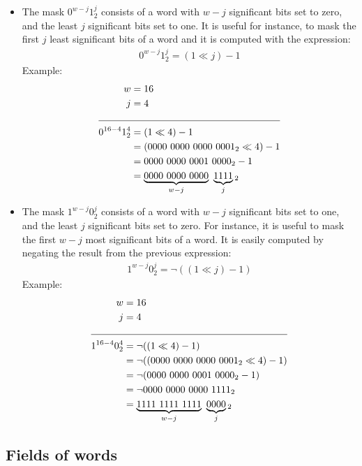 \begin{itemize}
    \item
    The mask $0^{w-j} 1^j_2$ consists of a word with $w-j$ significant bits set to zero, and the least $j$ significant bits set to one. It is useful for instance, to mask the first $j$ least significant bits of a word and it is computed with the expression:
    \begin{align*}
        0^{w-j} 1^j_2 = (1 \ll j) - 1
    \end{align*}
    Example:
    \begin{align*}
        w &= 16\\
        j &= 4\\
        \cline{1-2}
        0^{16-4} 1^4_2 &= (1 \ll 4) - 1\\
        &= (0000\ 0000\ 0000\ 0001_2 \ll 4) - 1\\
        &= 0000\ 0000\ 0001\ 0000_2 - 1\\
        &= \underbrace{0000\ 0000\ 0000}_{w-j}\ \underbrace{1111}_{j}{}_2
    \end{align*}
    
    \item
    The mask $1^{w-j} 0^j_2$ consists of a word with $w-j$ significant bits set to one, and the least $j$ significant bits set to zero. For instance, it is useful to mask the first $w - j$ most significant bits of a word. It is easily computed by negating the result from the previous expression:
    \begin{align*}
        1^{w-j} 0^j_2= \neg((1 \ll j) - 1)
    \end{align*}
    Example:
    \begin{align*}
        w &= 16\\
        j &= 4\\
        \cline{1-2}
        1^{16-4} 0^4_2 &= \neg((1 \ll 4) - 1)\\
        &= \neg((0000\ 0000\ 0000\ 0001_2 \ll 4) - 1)\\
        &= \neg(0000\ 0000\ 0001\ 0000_2 - 1)\\
        &= \neg0000\ 0000\ 0000\ 1111_2\\
        &= \underbrace{1111\ 1111\ 1111}_{w-j}\ \underbrace{0000}_{j}{}_2
    \end{align*}
\end{itemize}

\subsection{Fields of words} \label{sec:fieldsOfWords}

